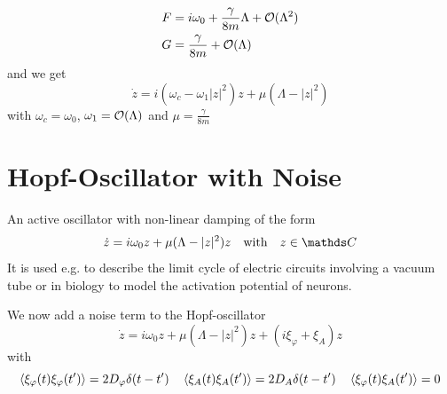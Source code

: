 \documentclass{notebook}
\begin{document}
%
\begin{align*}
	F &= i \omega_0 + \frac{\gamma}{8m} \Lambda + \mathcal{O}(\Lambda^2) \\
	G &= \frac{\gamma}{8m} + \mathcal{O}(\Lambda)
\end{align*}
%
and we get
%
\begin{equation}
\dot{z} = i (\omega_c - \omega_1 |z|^2)z + \mu(\Lambda - |z|^2)
\end{equation}
%
with $\omega_c = \omega_0$, $\omega_1 = \mathcal{O}(\Lambda)$ and $\mu = \frac{\gamma}{8m}$

\newpage 
\section{Hopf-Oscillator with Noise}

%
\begin{theorem}
	An active oscillator with non-linear damping of the form
	\begin{equation}
		\dot{z} = i \omega_0 z + \mu(\Lambda - |z|^2)z \quad \mathrm{with} \quad z \in \C
	\end{equation}
	It is used e.g. to describe the limit cycle of electric circuits involving a vacuum tube or in biology to model the activation potential of neurons.
\end{theorem}
%

We now add a noise term to the Hopf-oscillator
%
\begin{equation}
\dot{z} = i \omega_0 z + \mu(\Lambda - |z|^2)z + (i \xi_{\varphi} + \xi_A) z
\end{equation}
%
with 
%
\begin{equation*}
	\expval{\xi_{\varphi}(t)\xi_{\varphi}(t')} = 2 D_{\varphi} \delta(t-t') \quad \expval{\xi_A(t)\xi_A(t')} = 2 D_A \delta(t-t') \quad
	\expval{\xi_{\varphi}(t)\xi_A(t')} = 0
\end{equation*}
%
\end{document}
